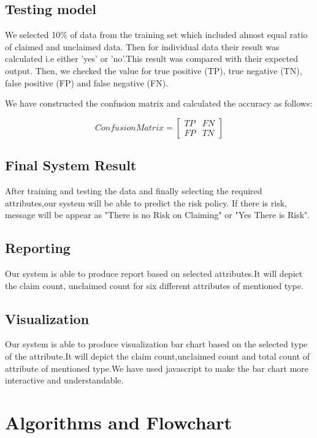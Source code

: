 \subsection{Testing model}
We selected 10\% of data from the training set which included almost equal ratio of claimed and unclaimed data. Then for individual data their result was calculated i.e either 'yes' or 'no'.This result was compared with their expected output. Then, we checked the value for true positive (TP), true negative (TN), false positive (FP) and false negative (FN).
\par We have constructed the confusion matrix and calculated the accuracy as follows:
\par
$$
 Confusion Matrix =
\begin{bmatrix}
TP & FN \\
FP & TN
\end{bmatrix}
$$
\subsection{Final System Result}
After training and testing the data and finally selecting the required attributes,our system will be able to predict the risk policy. If there is risk, message will be appear as "There is no Risk on Claiming" or "Yes There is Risk".
\subsection{Reporting}
Our system is able to produce report based on selected attributes.It will depict the claim count, unclaimed count for six different attributes of mentioned type.

\subsection{Visualization}
Our system is able to produce visualization bar chart based on the selected type of the attribute.It will depict the claim count,unclaimed count and total count of attribute of mentioned type.We have used javascript to make the bar chart more interactive and understandable.


\newpage
\section{Algorithms and Flowchart}
